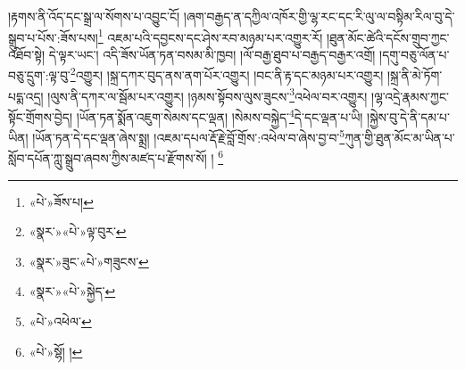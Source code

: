 །རྟགས་ནི་འོད་དང་སྒྲ་ལ་སོགས་པ་འབྱུང་ངོ། །ཞག་བརྒྱད་ན་དཀྱིལ་འཁོར་གྱི་ལྷ་རང་དང་རི་ལུ་ལ་བསྟིམ་རིལ་བུ་དེ་སྒྲུབ་པ་པོས་:ཟོས་པས།\footnote{«པེ་»ཟོས་པ།} འཇམ་པའི་དབྱངས་དང་ཤེས་རབ་མཉམ་པར་འགྱུར་རོ། །ཐུན་མོང་ཚེའི་དངོས་གྲུབ་ཀྱང་འཐོབ་སྟེ། དེ་ལྟར་ཡང་། འདི་ཟོས་ཡོན་ཏན་བསམ་མི་ཁྱབ། །ལོ་བརྒྱ་ཐུབ་པ་བརྒྱད་བརྒྱར་འགྲོ། །དགུ་བཅུ་ལོན་པ་བཅུ་དྲུག་:ལྟ་བུ་\footnote{«སྣར་»«པེ་»ལྟ་བུར་}འགྱུར། །སྐྲ་དཀར་བུད་ནས་ནག་པོར་འགྱུར། །བང་ནི་རྟ་དང་མཉམ་པར་འགྱུར། །སྐྲ་ནི་མེ་ཏོག་པདྨ་འདྲ། །ལུས་ནི་དཀར་ལ་སྦོམ་པར་འགྱུར། །ཉམས་སྟོབས་ལུས་ཟུངས་\footnote{«སྣར་»ཟུང་«པེ་»གཟུངས་}འཕེལ་བར་འགྱུར། །ལྷ་འདྲེ་རྣམས་ཀྱང་སྟོང་གྲོགས་བྱེད། །ཡོན་ཏན་སྨོན་འཇུག་སེམས་དང་ལྡན། །སེམས་བསྐྱེད་\footnote{«སྣར་»«པེ་»སྐྱེད་}དེ་དང་ལྡན་པ་ཡི། །སྐྱེས་བུ་དེ་ནི་དམ་པ་ཡིན། །ཡོན་ཏན་དེ་དང་ལྡན་ཞེས་སྨྲ། །འཇམ་དཔལ་རྡོ་རྗེ་བློ་གྲོས་:འཕེལ་བ་ཞེས་བྱ་བ་\footnote{«པེ་»འཕེལ་}ཀུན་གྱི་ཐུན་མོང་མ་ཡིན་པ་སློབ་དཔོན་ཀླུ་སྒྲུབ་ཞབས་ཀྱིས་མཛད་པ་རྫོགས་སོ། ། \footnote{«པེ་»སྷོ། ། }